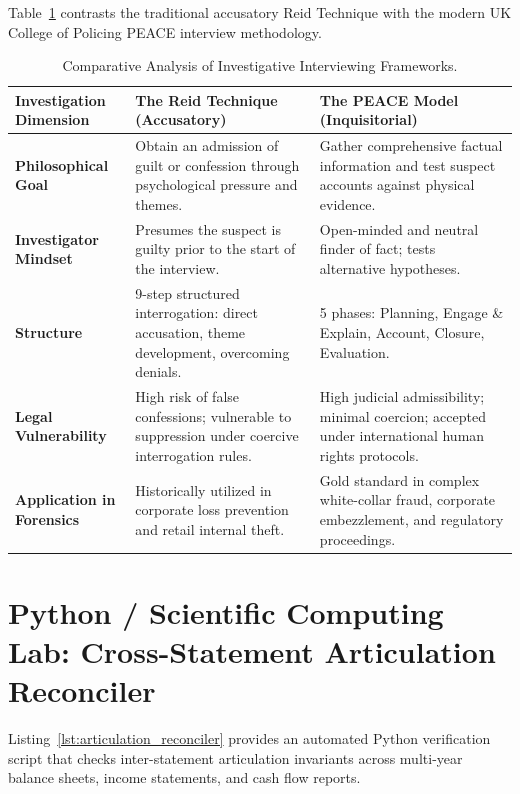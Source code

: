 Table~\ref{tab:comparison_interviews} contrasts the traditional accusatory Reid Technique with the modern UK College of Policing PEACE interview methodology.

\begin{table}[htbp]
\centering
\small
\begin{tabularx}{\textwidth}{lXX}
\toprule
\textbf{Investigation Dimension} & \textbf{The Reid Technique (Accusatory)} & \textbf{The PEACE Model (Inquisitorial)} \\
\midrule
\textbf{Philosophical Goal} & Obtain an admission of guilt or confession through psychological pressure and themes. & Gather comprehensive factual information and test suspect accounts against physical evidence. \\
\addlinespace
\textbf{Investigator Mindset} & Presumes the suspect is guilty prior to the start of the interview. & Open-minded and neutral finder of fact; tests alternative hypotheses. \\
\addlinespace
\textbf{Structure} & 9-step structured interrogation: direct accusation, theme development, overcoming denials. & 5 phases: Planning, Engage \& Explain, Account, Closure, Evaluation. \\
\addlinespace
\textbf{Legal Vulnerability} & High risk of false confessions; vulnerable to suppression under coercive interrogation rules. & High judicial admissibility; minimal coercion; accepted under international human rights protocols. \\
\addlinespace
\textbf{Application in Forensics} & Historically utilized in corporate loss prevention and retail internal theft. & Gold standard in complex white-collar fraud, corporate embezzlement, and regulatory proceedings. \\
\bottomrule
\end{tabularx}
\caption{Comparative Analysis of Investigative Interviewing Frameworks.}
\label{tab:comparison_interviews}
\end{table}

\section{Python / Scientific Computing Lab: Cross-Statement Articulation Reconciler}

Listing~\ref{lst:articulation_reconciler} provides an automated Python verification script that checks inter-statement articulation invariants across multi-year balance sheets, income statements, and cash flow reports.

